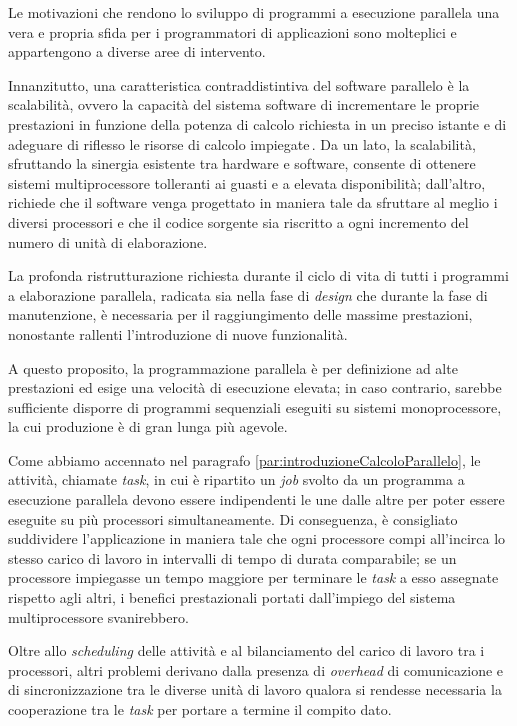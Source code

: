 Le motivazioni che rendono lo sviluppo di programmi a esecuzione parallela una vera e propria sfida per i programmatori
di applicazioni sono molteplici e appartengono a diverse aree di intervento.

Innanzitutto, una caratteristica contraddistintiva del software parallelo
\`e la scalabilit\`a, ovvero la capacit\`a del sistema software di incrementare le proprie prestazioni in funzione della potenza
di calcolo richiesta in un preciso istante e di adeguare di riflesso le risorse di calcolo impiegate\,\cite{Michael2007}.\newline
Da un lato, la scalabilit\`a, sfruttando la sinergia esistente tra hardware e software, consente di ottenere
sistemi multiprocessore tolleranti ai guasti e a elevata disponibilit\`a; dall'altro, richiede che il software venga progettato
in maniera tale da sfruttare al meglio i diversi processori e che il codice sorgente sia riscritto a ogni
incremento del numero di unit\`a di elaborazione.

La profonda ristrutturazione richiesta durante il ciclo di vita di tutti i  programmi a elaborazione parallela, radicata sia nella
fase di \textit{design} che durante la fase di manutenzione, \`e necessaria per il raggiungimento delle massime prestazioni, nonostante rallenti l'introduzione di nuove funzionalit\`a.

A questo proposito, la programmazione parallela \`e per definizione ad alte prestazioni ed esige una
velocit\`a di esecuzione elevata; in caso contrario, sarebbe sufficiente disporre di programmi sequenziali eseguiti su sistemi monoprocessore, la cui produzione \`e di gran lunga pi\`u agevole.

Come abbiamo accennato nel paragrafo \ref{par:introduzioneCalcoloParallelo}, le attivit\`a, chiamate \textit{task}, in cui \`e ripartito un \textit{job} svolto da un
programma a esecuzione parallela devono essere indipendenti le une dalle altre per poter essere eseguite su pi\`u processori simultaneamente.\newline
Di conseguenza, \`e consigliato suddividere l'applicazione in maniera tale che ogni processore compi all'incirca lo stesso carico di lavoro in intervalli
di tempo di durata comparabile; se un processore impiegasse un tempo maggiore per terminare le \textit{task} a esso assegnate rispetto agli altri, i benefici prestazionali portati
dall'impiego del sistema multiprocessore svanirebbero.

Oltre allo \textit{scheduling} delle attivit\`a e al bilanciamento del carico di lavoro tra i processori, altri problemi derivano dalla presenza di
\textit{overhead} di comunicazione e di sincronizzazione tra le diverse unit\`a di lavoro qualora si rendesse necessaria la cooperazione tra le
\textit{task} per portare a termine il compito dato.

